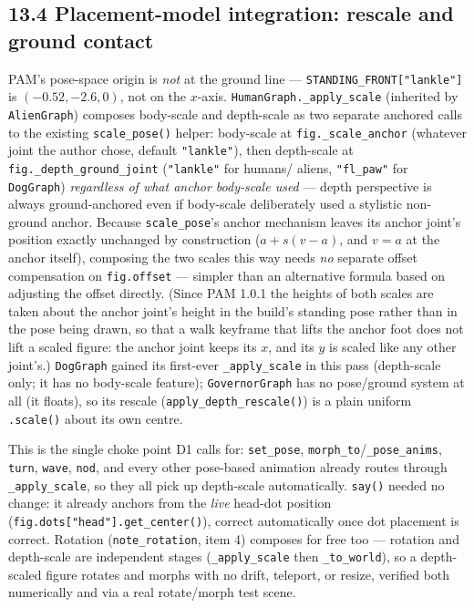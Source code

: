 \documentclass[
  12pt,
  letterpaper,
]{book}
\begin{document}
\subsection{\texorpdfstring{13.4 Placement-model integration: rescale and ground contact}{13.4 Placement-model integration}}\label{placement-model-integration-depth}

PAM's pose-space origin is \emph{not} at the ground line ---
\texttt{STANDING\_FRONT["lankle"]} is $(-0.52, -2.6, 0)$, not on the
$x$-axis. \texttt{HumanGraph.\_apply\_scale} (inherited by
\texttt{AlienGraph}) composes body-scale and depth-scale as two
separate anchored calls to the existing \texttt{scale\_pose()} helper:
body-scale at \texttt{fig.\_scale\_anchor} (whatever joint the author
chose, default \texttt{"lankle"}), then depth-scale at
\texttt{fig.\_depth\_ground\_joint} (\texttt{"lankle"} for humans/
aliens, \texttt{"fl\_paw"} for \texttt{DogGraph}) \emph{regardless of
what anchor body-scale used} --- depth perspective is always
ground-anchored even if body-scale deliberately used a stylistic
non-ground anchor. Because \texttt{scale\_pose}'s anchor mechanism
leaves its anchor joint's position exactly unchanged by construction
($a + s(v-a)$, and $v = a$ at the anchor itself), composing the two
scales this way needs \emph{no} separate offset compensation on
\texttt{fig.offset} --- simpler than an alternative formula based on
adjusting the offset directly. (Since PAM 1.0.1 the heights of both
scales are taken about the anchor joint's height in the build's standing
pose rather than in the pose being drawn, so that a walk keyframe that
lifts the anchor foot does not lift a scaled figure: the anchor joint
keeps its $x$, and its $y$ is scaled like any other joint's.) \texttt{DogGraph} gained its first-ever
\texttt{\_apply\_scale} in this pass (depth-scale only; it has no
body-scale feature); \texttt{GovernorGraph} has no pose/ground system
at all (it floats), so its rescale (\texttt{apply\_depth\_rescale()})
is a plain uniform \texttt{.scale()} about its own centre.

This is the single choke point D1 calls for: \texttt{set\_pose},
\texttt{morph\_to}/\texttt{\_pose\_anims}, \texttt{turn},
\texttt{wave}, \texttt{nod}, and every other pose-based animation
already routes through \texttt{\_apply\_scale}, so they all pick up
depth-scale automatically. \texttt{say()} needed no change: it already
anchors from the \emph{live} head-dot position
(\texttt{fig.dots["head"].get\_center()}), correct automatically once
dot placement is correct. Rotation (\texttt{note\_rotation}, item 4)
composes for free too --- rotation and depth-scale are independent
stages (\texttt{\_apply\_scale} then \texttt{\_to\_world}), so a
depth-scaled figure rotates and morphs with no drift, teleport, or
resize, verified both numerically and via a real rotate/morph test
scene.
\end{document}
